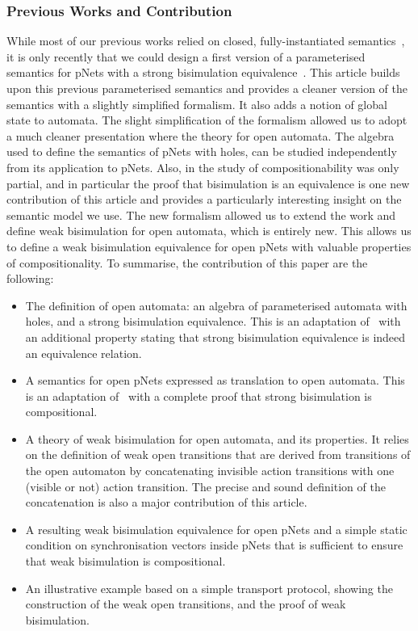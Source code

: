\documentclass{lmcs}
\begin{document}
\subsubsection*{Previous Works and Contribution}
While most of our previous works relied on closed, fully-instantiated semantics~\cite{BBCHM:article2008,AmeurBoulifa2017,HKM-FASE16}, it is only recently that we could design a first version of a  parameterised semantics for pNets with a strong bisimulation equivalence~\cite{henrio:Forte2016}. This article builds upon this previous parameterised semantics and provides a cleaner version of the semantics with a slightly simplified formalism. It also adds a notion of global state to automata. The slight simplification of the formalism allowed us to adopt a much cleaner presentation where the theory for open automata. The algebra used to define the semantics of pNets with holes, can be studied independently from its application to pNets. Also, in \cite{henrio:Forte2016} the study of compositionability was only partial, and in particular the proof that bisimulation is an equivalence is one new contribution of this article and provides a particularly interesting insight on the semantic model we use.
The new formalism allowed us to extend the work and define weak bisimulation  for open automata, which is entirely new. This allows us to define a weak bisimulation equivalence for open pNets with valuable properties of compositionality. 
To summarise, the contribution of this paper are the following:
\begin{itemize}
\item The definition of open automata: an algebra of parameterised automata with holes, and a strong bisimulation equivalence. This is an adaptation of~\cite{henrio:Forte2016} with an additional property stating that strong bisimulation equivalence is indeed an equivalence relation.
\item A semantics for open pNets expressed as translation to open automata. This is an adaptation of~\cite{henrio:Forte2016} with a complete proof that strong bisimulation is compositional.
\item A theory of weak bisimulation for open automata, and its properties. It relies on the definition of weak open transitions that are derived from transitions of the open automaton by concatenating invisible action transitions with one (visible or not) action transition. The precise and sound definition of the concatenation is also a major contribution of this article.
\item A resulting weak bisimulation equivalence for open pNets and a simple static condition on synchronisation vectors inside pNets that is sufficient to ensure that weak bisimulation is compositional.
\item An illustrative example based on a simple transport protocol, showing the construction of the weak open transitions, and the proof of weak bisimulation.
\end{itemize}
\end{document}
